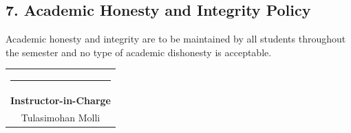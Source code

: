 \documentclass[
]{article}
\begin{document}
\subsection{7. Academic Honesty and Integrity
Policy}\label{academic-honesty-and-integrity-policy}

Academic honesty and integrity are to be maintained by all students
throughout the semester and no type of academic dishonesty is
acceptable.

\vspace{24pt}
\begin{flushright}
    \begin{tabular}{c}
        \rule{4cm}{0.4pt} \\
        \textbf{Instructor-in-Charge} \\
        Tulasimohan Molli
    \end{tabular}
\end{flushright}
\end{document}
